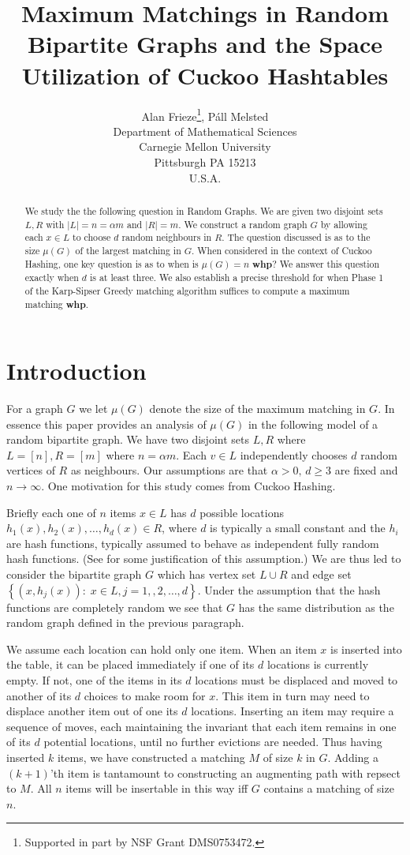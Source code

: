 \documentclass[11pt]{article}
\author{Alan Frieze\thanks{Supported in part by NSF Grant DMS0753472.}, P\'all Melsted\\
Department of Mathematical Sciences\\Carnegie Mellon University\\Pittsburgh PA 15213\\
U.S.A.}
\title{Maximum Matchings in Random Bipartite Graphs and the Space Utilization of Cuckoo Hashtables}
\date{}
\def\a{\alpha}
\def\m{\mu}
\def\whp{{\bf whp}}
\newcommand{\set}[1]{\left\{#1\right\}}
\begin{document}
\maketitle

\begin{abstract}
We study the the following question in Random Graphs. 
We are given two disjoint sets $L,R$ with $|L|=n=\a m$ and $|R|=m$. We construct a random graph $G$ by allowing each
$x\in L$ to choose $d$ random neighbours in $R$. The question discussed is as to the size $\m(G)$ of the largest matching in $G$.
When considered in the context of Cuckoo Hashing, one key question is as to when is $\m(G)=n$ \whp? 
We answer this question exactly when $d$
is at least three. We also establish a precise threshold for when Phase 1 of the Karp-Sipser Greedy matching algorithm
suffices to compute a maximum matching \whp.
\end{abstract}


\section{Introduction}
For a graph $G$ we let $\m(G)$ denote the size of the maximum matching in $G$.
In essence this paper provides an analysis of $\m(G)$ 
in the following model of a random bipartite graph. We have two disjoint
sets $L,R$ where $L=[n],R=[m]$ where $n=\a m$. Each $v\in L$ independently chooses $d$ random vertices of $R$ as neighbours. 
Our assumptions are that $\a>0,\,d\geq 3$ are fixed and $n\to \infty$. One motivation for this study comes from
Cuckoo Hashing.

Briefly each one of $n$ items $x\in L$ has
$d$ possible locations $h_1(x),h_2(x),\ldots,h_d(x)\in R$, where $d$ is
typically a small constant and the $h_i$ are hash functions, typically
assumed to behave as independent fully random hash functions.  (See
\cite{MVad} for some justification of this assumption.)  
We are thus led to consider the bipartite graph $G$ which has vertex set $L\cup R$ and edge set $\set{(x,h_j(x)):\;x\in L,j=1,,2,\ldots,d}$. 
Under the assumption that the hash functions are completely random we see that $G$ has the 
same distribution as the random graph defined in the previous paragraph. 

We assume
each location can hold only one item.  When an item $x$ is inserted
into the table, it can be placed immediately if one of its $d$ locations is
currently empty.  If not, one of the items in its $d$ locations must
be displaced and moved to another of its $d$ choices to make room
for $x$.  This item in turn may need to displace another item out of one
its $d$ locations.  Inserting an item may require a sequence of moves,
each maintaining the invariant that each item remains in one of its
$d$ potential locations, until no further evictions are needed. 
Thus having inserted $k$ items, we have constructed a matching $M$ of size $k$ in $G$. Adding a $(k+1)$'th
item is tantamount to constructing an augmenting path with repsect to $M$.
All $n$ items will be insertable
in this way iff $G$ contains a matching of size $n$.
\end{document}
